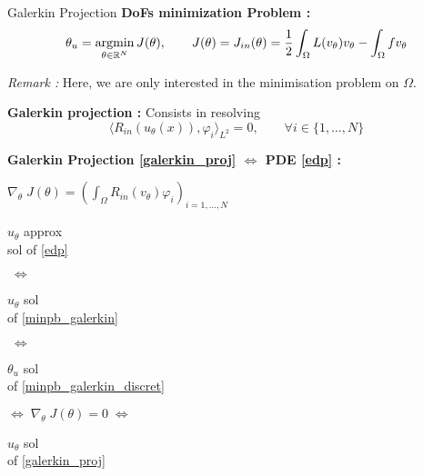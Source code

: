 \begin{frame}{Galerkin Projection}
	\textbf{DoFs minimization Problem :}
	\begin{equation}
		\displaystyle \theta_u=\operatorname*{argmin}_{\theta\in\mathbb{R}^N} J(\theta), \qquad J(\theta)=J_{in}(\theta)=\frac{1}{2}\int_\Omega L(v_\theta)v_\theta - \int_\Omega fv_\theta \label{minpb_galerkin_discret}
	\end{equation}
%		
	
	\footnotesize	
	\textit{Remark :} Here, we are only interested in the minimisation problem on $\Omega$.
	
	\normalsize	
	
	\textbf{Galerkin projection :} Consists in resolving
	\begin{equation}
		\langle R_{in}(u_\theta(x)),\varphi_i\rangle_{L^2}=0, \qquad \forall i\in\{1,\dots,N\}\label{galerkin_proj}
	\end{equation}

	\footnotesize
	\begin{center}
		\begin{tcolorbox}[
			colback=white, %
			colframe=other, %
			arc=2mm, %
			boxrule=0.5pt, %
			breakable, enhanced jigsaw,
			width=\linewidth
			]
			
			\textbf{Galerkin Projection \eqref{galerkin_proj} $\Leftrightarrow$ PDE \eqref{edp} :}
			
			\centering
			$\nabla_\theta \; J(\theta)=\left(\int_\Omega R_{in}(v_\theta)\varphi_i\right)_{i=1,\dots,N} \qquad $  
			
			\vspace{5pt}
			
			\begin{minipage}{0.15\linewidth}
				\centering
				$u_\theta$ approx \\
				sol of \eqref{edp}
			\end{minipage} $\; \Leftrightarrow \;$	\begin{minipage}{0.1\linewidth}
				\centering
				$u_\theta$ sol \\
				of \eqref{minpb_galerkin}
			\end{minipage} $\; \Leftrightarrow \;$	\begin{minipage}{0.1\linewidth}
				\centering
				$\theta_u$ sol \\
				of \eqref{minpb_galerkin_discret}
			\end{minipage} $\Leftrightarrow \; \nabla_\theta \; J(\theta)=0 \; \Leftrightarrow$ \begin{minipage}{0.1\linewidth}
				\centering
				$u_\theta$ sol \\
				of \eqref{galerkin_proj}
			\end{minipage}
		

\end{tcolorbox}
\end{center}
\end{frame}
